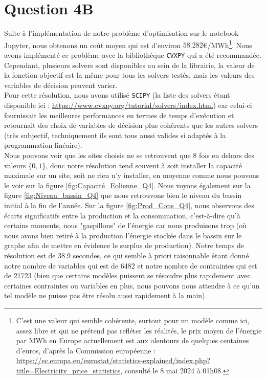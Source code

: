 \documentclass{article}
\begin{document}
\section*{Question 4B}
Suite à l'implémentation de notre problème d'optimisation sur le notebook Jupyter, nous obtenons 
un coût moyen qui est d'environ $\mathbf{58.282}$\euro/MWh\footnote{C'est une valeur qui semble cohérente, surtout pour un modèle comme ici, 
assez libre et qui ne prétend pas refléter les réalités, le prix moyen de l'énergie par MWh en Europe actuellement 
est aux alentours de quelques centaines d'euros, d'après la Commission européenne : 
\url{https://ec.europa.eu/eurostat/statistics-explained/index.php?title=Electricity_price_statistics}, 
consulté le 8 mai 2024 à 01h08.}.
Nous avons implémenté ce problème avec la bibliothèque \verb|CVXPY| qui a été recommandée. Cependant, plusieurs solvers sont disponibles au sein de la librairie, la valeur de la fonction objectif est la même pour tous les solvers testés, mais les valeurs des variables de décision peuvent varier.\\
Pour cette résolution, nous avons utilisé \verb|SCIPY| (la liste des solvers étant disponible ici : \url{https://www.cvxpy.org/tutorial/solvers/index.html})
car celui-ci fournissait les meilleures performances en termes de temps d'exécution et retournait des choix de variables de décision plus cohérents que les autres solvers 
(très subjectif, techniquement ils sont tous aussi valides si adaptés à la programmation linéaire). \\
Nous pouvons voir que les sites choisis ne se retrouvent que 8 fois en dehors des valeurs $\{0,1\}$, donc notre résolution
tend souvent à soit installer la capacité maximale sur un site, soit ne rien n'y installer, en moyenne comme nous pouvons le voir sur la figure \ref{fig:Capacité_Eolienne_Q4}.
Nous voyons également sur la figure \ref{fig:Niveau_bassin_Q4} que nous retrouvons bien le niveau du bassin initial à la fin de l'année. Sur la figure \ref{fig:Prod_Cons_Q4}, nous observons des écarts significatifs entre la production et la consommation, c'est-à-dire 
qu'à certains moments, nous "gaspillons" de l'énergie car nous produisons trop 
(où nous avons bien retiré à la production l'énergie stockée dans le bassin sur le graphe afin de mettre en évidence le surplus de production).
Notre temps de résolution est de 38.9 secondes, ce qui semble à priori raisonnable étant donné notre nombre 
de variables qui est de 6482 et notre nombre de contraintes qui est de 21723 (bien que certains modèles puissent se résoudre plus rapidement 
avec certaines contraintes ou variables en plus, nous pouvons nous attendre à ce qu'un tel modèle ne puisse pas être 
résolu aussi rapidement à la main).
\end{document}

